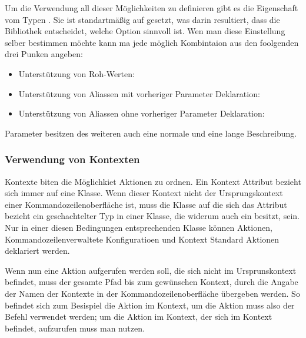 Um die Verwendung all dieser Möglichkeiten zu definieren gibt es die  Eigenschaft vom Typen .
Sie ist standartmä\ss ig auf  gesetzt, was darin resultiert, dass die Bibliothek entscheidet, welche Option sinnvoll ist.
Wen man diese Einstellung selber bestimmen möchte kann ma jede möglich Kombintaion aus den foolgenden drei Punken angeben:
\begin{itemize}
 \item Unterstützung von Roh-Werten: 
 \item Unterstützung von Aliassen mit vorheriger Parameter Deklaration: 
 \item Unterstützung von Aliassen ohne vorheriger Parameter Deklaration: 
\end{itemize}

Parameter besitzen des weiteren auch eine normale und eine lange Beschreibung.
\subsubsection{Verwendung von Kontexten}
Kontexte biten die Möglichkiet Aktionen zu ordnen.
Ein Kontext Attribut bezieht sich immer auf eine Klasse.
Wenn dieser Kontext nicht der Ursprungskontext einer Kommandozeilenoberfläche ist, 
muss die Klasse auf die sich das Attribut bezieht ein geschachtelter Typ in einer Klasse, die widerum auch ein  besitzt, sein.
Nur in einer diesen Bedingungen entsprechenden Klasse können Aktionen, Kommandozeilenverwaltete Konfiguratioen und Kontext Standard Aktionen deklariert werden.

Wenn nun eine Aktion aufgerufen werden soll, die sich nicht im Ursprunskontext befindet,
muss der gesamte Pfad bis zum gewünschen Kontext, durch die Angabe der Namen der Kontexte in der Kommandozeilenoberfl\"ache \"ubergeben werden.
So befindet sich zum Besispiel die  Aktion im  Kontext,
um die Aktion muss also der Befehl  verwendet werden;
um die  Aktion im  Kontext, der sich im  Kontext befindet,
aufzurufen muss man  nutzen.


